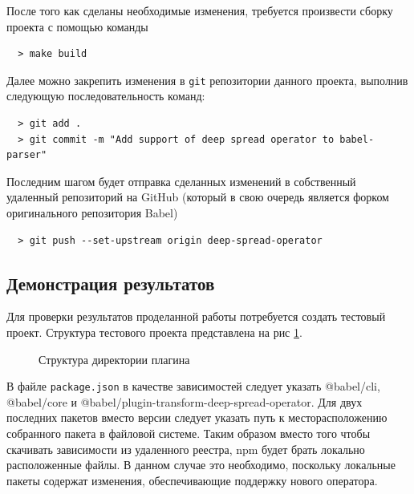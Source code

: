 \documentclass[14pt, a4paper]{article}
\def\code#1{\texttt{#1}} %
\begin{document}


После того как сделаны необходимые изменения, требуется произвести сборку проекта с помощью команды
\begin{lstlisting}
  > make build
 \end{lstlisting}

Далее можно закрепить изменения в \code{git} репозитории данного проекта, выполнив следующую последовательность команд:
\begin{lstlisting}
  > git add .
  > git commit -m "Add support of deep spread operator to babel-parser"
\end{lstlisting}

Последним шагом будет отправка сделанных изменений в собственный удаленный репозиторий на GitHub (который
в свою очередь является форком оригинального репозитория Babel)
\begin{lstlisting}
  > git push --set-upstream origin deep-spread-operator
\end{lstlisting}
\subsection{Демонстрация результатов}

Для проверки результатов проделанной работы потребуется создать тестовый проект. Структура тестового проекта 
представлена на рис \ref{test_struct}.
\begin{figure}[h!]
  \centering
  \caption{Структура директории плагина}
  \label{test_struct}
\end{figure}


В файле \code{package.json} в качестве зависимостей следует указать @babel/cli, @babel/core и 
@babel/plugin-transform-deep-spread-operator. Для двух последних пакетов вместо версии 
следует указать путь к месторасположению собранного пакета в файловой системе. Таким образом вместо 
того чтобы скачивать зависимости из удаленного реестра, npm будет брать локально расположенные файлы.
В данном случае это необходимо, поскольку локальные пакеты содержат изменения, обеспечивающие поддержку 
нового оператора.
\end{document}
